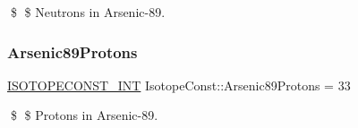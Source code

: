 \$ \$ Neutrons in Arsenic-\/89. \mbox{\label{group___isotope_const-_arsenic-_as89_gaa585fe604efface868370e8cec67f02c}} 
\subsubsection{\texorpdfstring{Arsenic89\+Protons}{Arsenic89Protons}}
{\footnotesize\ttfamily \mbox{\hyperlink{group___isotope_const-_macros_ga5f18360b3e99483a35c32d789e62621c}{I\+S\+O\+T\+O\+P\+E\+C\+O\+N\+S\+T\+\_\+\+I\+NT}} Isotope\+Const\+::\+Arsenic89\+Protons = 33}

\$ \$ Protons in Arsenic-\/89. 
